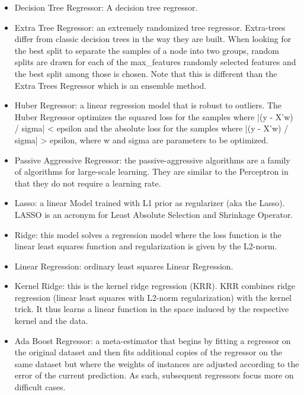 \documentclass[a4paper]{article}
\begin{document}
\begin{itemize}
					\item Decision Tree Regressor: A decision tree regressor.
					
					\item Extra Tree Regressor: an extremely randomized tree regressor. Extra-trees differ from classic decision trees in the way they are built. When looking for the best split to separate the samples of a node into two groups, random splits are drawn for each of the max\_features randomly selected features and the best split among those is chosen. Note that this is different than the Extra Trees Regressor which is an ensemble method.
					
					\item Huber Regressor: a linear regression model that is robust to outliers. The Huber Regressor optimizes the squared loss for the samples where |(y - X'w) / sigma| < epsilon and the absolute loss for the samples where |(y - X'w) / sigma| > epsilon, where w and sigma are parameters to be optimized. 
					
					\item Passive Aggressive Regressor: the passive-aggressive algorithms are a family of algorithms for large-scale learning. They are similar to the Perceptron in that they do not require a learning rate. 
					
					\item Lasso: a linear Model trained with L1 prior as regularizer (aka the Lasso). LASSO is an acronym for Least Absolute Selection and Shrinkage Operator.
					
					\item Ridge: this model solves a regression model where the loss function is the linear least squares function and regularization is given by the L2-norm.
					
					\item Linear Regression: ordinary least squares Linear Regression.
					
					\item Kernel Ridge: this is the kernel ridge regression (KRR). KRR combines ridge regression (linear least squares with L2-norm regularization) with the kernel trick. It thus learns a linear function in the space induced by the respective kernel and the data. 
					
					\item Ada Boost Regressor: a meta-estimator that begins by fitting a regressor on the original dataset and then fits additional copies of the regressor on the same dataset but where the weights of instances are adjusted according to the error of the current prediction. As such, subsequent regressors focus more on difficult cases.
					

\end{itemize}
\end{document}
